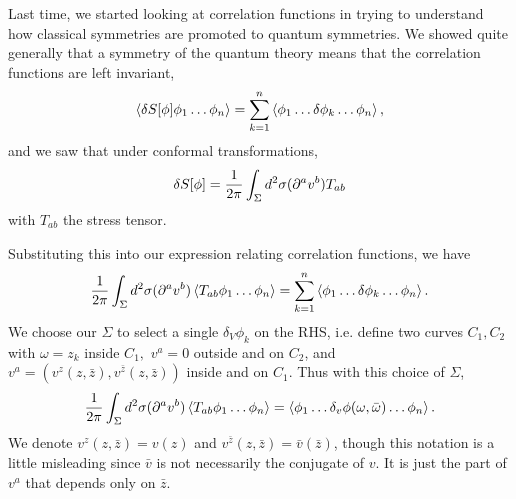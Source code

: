 Last time, we started looking at correlation functions in trying to understand how classical symmetries are promoted to quantum symmetries. We showed quite generally that a symmetry of the quantum theory means that the correlation functions are left invariant,
\begin{equation*}
    \left< \delta S[\phi]\phi_1\ldots \phi_n \right>=\sum_{k=1}^n \left< \phi_1 \ldots \delta \phi_k \ldots \phi_n \right>,
\end{equation*}
and we saw that under conformal transformations,
\begin{equation}
    \delta S[\phi]=\frac{1}{2\pi} \int_\Sigma d^2\sigma (\partial^a v^b)T_{ab}
\end{equation}
with $T_{ab}$ the stress tensor.

Substituting this into our expression relating correlation functions, we have
\begin{equation}
    \frac{1}{2\pi} \int_\Sigma d^2\sigma (\partial^a v^b) \left< T_{ab}\phi_1\ldots \phi_n \right>=\sum_{k=1}^n \left< \phi_1 \ldots \delta \phi_k \ldots \phi_n \right>.
\end{equation}
We choose our $\Sigma$ to select a single $\delta_V \phi_k$ on the RHS, i.e. define two curves $C_1,C_2$ with $\omega=z_k$ inside $C_1,$ $v^a=0$ outside and on $C_2$, and $v^a=(v^z(z,\bar z),v^{\bar z}(z,\bar z))$ inside and on $C_1.$ Thus with this choice of $\Sigma$,
\begin{equation}
    \frac{1}{2\pi} \int_\Sigma d^2\sigma (\partial^a v^b)\left< T_{ab} \phi_1 \ldots \phi_n \right>=\left< \phi_1 \ldots \delta_v \phi(\omega,\bar \omega)\ldots \phi_n \right>.
\end{equation}
We denote $v^z(z,\bar z)=v(z)$ and $v^{\bar z}(z,\bar z)=\bar v(\bar z)$, though this notation is a little misleading since $\bar v$ is not necessarily the conjugate of $v$. It is just the part of $v^a$ that depends only on $\bar z$.

